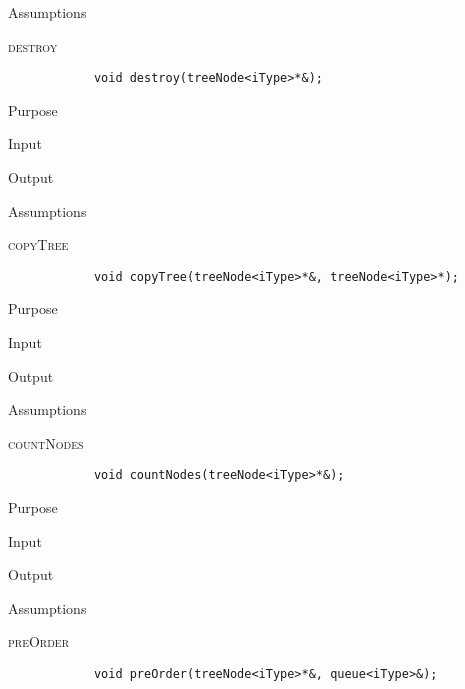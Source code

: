 \documentclass[pdftex, 12pt]{article}
\begin{document}
\begin{description}
\begin{description}
			\item{Assumptions}

		\end{description}
	\item{\textsc{destroy}}
		\begin{lstlisting}
			void destroy(treeNode<iType>*&);
		\end{lstlisting}
		\begin{description}

			\item{Purpose}

			\item{Input}

			\item{Output}

			\item{Assumptions}

		\end{description}
	\item{\textsc{copyTree}}
		\begin{lstlisting}
			void copyTree(treeNode<iType>*&, treeNode<iType>*);
		\end{lstlisting}
		\begin{description}

			\item{Purpose}

			\item{Input}

			\item{Output}

			\item{Assumptions}

		\end{description}
	\item{\textsc{countNodes}}
		\begin{lstlisting}
			void countNodes(treeNode<iType>*&);
		\end{lstlisting}
		\begin{description}

			\item{Purpose}

			\item{Input}

			\item{Output}

			\item{Assumptions}

		\end{description}
	\item{\textsc{preOrder}}
		\begin{lstlisting}
			void preOrder(treeNode<iType>*&, queue<iType>&);
		\end{lstlisting}
		\begin{description}


\end{description}
\end{description}
\end{document}
